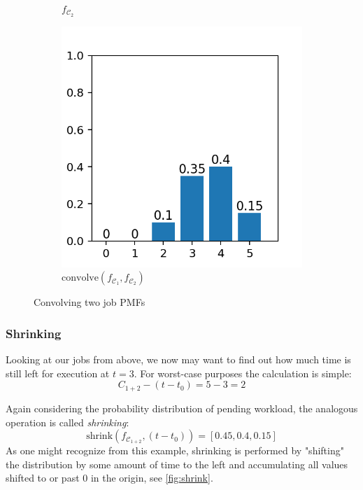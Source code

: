 \documentclass[a4paper,oneside]{csthesis}
\begin{document}
\begin{figure}[h]
\begin{subfigure}[c]{0.3\textwidth}
        \caption{$f_{\mathcal{C}_2}$}\label{}
    \end{subfigure}
    \quad
    \begin{subfigure}[c]{0.3\textwidth}
        \includegraphics[width=\textwidth]{figures/ex_convolve.png}
        \caption{$\text{convolve}(f_{\mathcal{C}_1}, f_{\mathcal{C}_2})$}\label{}
    \end{subfigure}
    \caption{Convolving two job PMFs}\label{fig:convolve}
\end{figure}

\subsubsection{Shrinking}
Looking at our jobs from above, we now may want to find out how much time is still left for execution at $t = 3$. For worst-case purposes the calculation is simple:
\begin{equation*}
    C_{1+2} - (t - t_0) = 5 - 3 = 2
\end{equation*}

Again considering the probability distribution of pending workload, the analogous operation is called \textit{shrinking}:
\begin{equation*}
    \text{shrink}(f_{\mathcal{C}_{1+2}}, (t - t_0)) = [0.45, 0.4, 0.15]
\end{equation*}
As one might recognize from this example, shrinking is performed by "shifting" the distribution by some amount of time to the left and accumulating all values shifted to or past 0 in the origin, see \cref{fig:shrink}.
\end{document}
